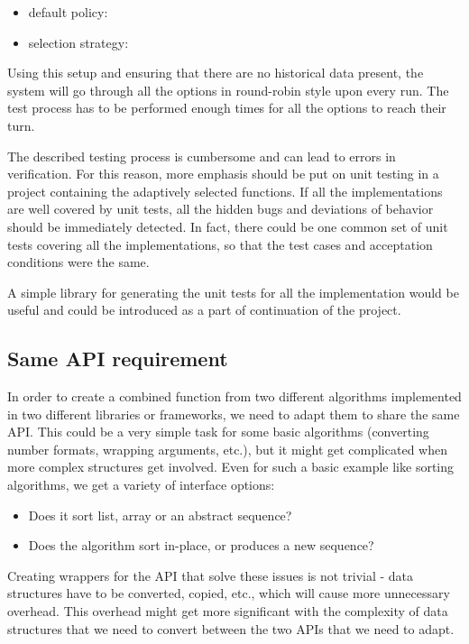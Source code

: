  \begin{itemize}
 	\item default policy: 
 	\item selection strategy: 
 \end{itemize}

Using this setup and ensuring that there are no historical data present, the system will go through all the options in round-robin style upon every run. The test process has to be performed enough times for all the options to reach their turn.

The described testing process is cumbersome and can lead to errors in verification. For this reason, more emphasis should be put on unit testing in a project containing the adaptively selected functions. If all the implementations are well covered by unit tests, all the hidden bugs and deviations of behavior should be immediately detected. In fact, there could be one common set of unit tests covering all the implementations, so that the test cases and acceptation conditions were the same.

A simple library for generating the unit tests for all the implementation would be useful and could be introduced as a part of continuation of the project.

\subsection{Same API requirement}

In order to create a combined function from two different algorithms implemented in two different libraries or frameworks, we need to adapt them to share the same API. This could be a very simple task for some basic algorithms (converting number formats, wrapping arguments, etc.), but it might get complicated when more complex structures get involved. Even for such a basic example like sorting algorithms, we get a variety of interface options:

\begin{itemize}
	\item Does it sort list, array or an abstract sequence?
	\item Does the algorithm sort in-place, or produces a new sequence?
\end{itemize}

Creating wrappers for the API that solve these issues is not trivial - data structures have to be converted, copied, etc., which will cause more unnecessary overhead. This overhead might get more significant with the complexity of data structures that we need to convert between the two APIs that we need to adapt.